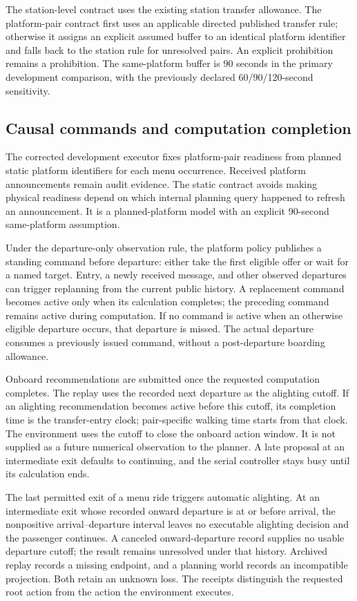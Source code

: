 \documentclass[preprint,12pt,authoryear]{elsarticle}
\begin{document}
The station-level contract uses the existing station transfer allowance. The
platform-pair contract first uses an applicable directed published transfer rule;
otherwise it assigns an explicit assumed buffer to an identical platform
identifier and falls back to the station rule for unresolved pairs. An explicit
prohibition remains a prohibition. The same-platform buffer is 90 seconds in the
primary development comparison, with the previously declared 60/90/120-second
sensitivity.

\subsection{Causal commands and computation completion}
The corrected development executor fixes platform-pair readiness from planned
static platform identifiers for each menu occurrence. Received platform
announcements remain audit evidence. The static contract avoids making physical
readiness depend on which internal planning query happened to refresh an
announcement. It is a planned-platform model with an explicit 90-second
same-platform assumption.

Under the departure-only observation rule, the platform policy publishes a
standing command before departure: either take the first eligible offer or
wait for a named target. Entry, a newly received message, and other observed
departures can trigger replanning from the current public history. A replacement
command becomes active only when its calculation completes; the preceding
command remains active during computation. If no command is active when an
otherwise eligible departure occurs, that departure is missed. The actual
departure consumes a previously issued command, without a post-departure
boarding allowance.

Onboard recommendations are submitted once the requested computation completes.
The replay uses the recorded next departure as the alighting cutoff. If an
alighting recommendation becomes active before this cutoff, its completion time
is the transfer-entry clock; pair-specific walking time starts from that clock.
The environment uses the cutoff to close the onboard action window. It is not supplied as a
future numerical observation to the planner. A late proposal at an intermediate
exit defaults to continuing, and the serial controller stays busy until its
calculation ends.

The last permitted exit of a menu ride triggers automatic alighting. At an
intermediate exit whose recorded onward departure is at or before arrival,
the nonpositive arrival--departure interval leaves no executable alighting
decision and the passenger continues. A canceled onward-departure record
supplies no usable departure cutoff; the
result remains unresolved under that history. Archived replay records a missing
endpoint, and a planning world records an incompatible projection. Both retain
an unknown loss. The receipts distinguish the requested root action from the
action the environment executes.
\end{document}
